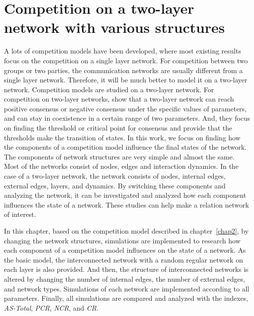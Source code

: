 

\chapter{Competition on a two-layer network with various structures}
\label{chap3}
A lots of competition models have been developed, where most existing results focus on the competition on a single layer network. For competition between two groups or two parties, the communication networks are usually different from a single layer network. Therefore, it will be much better to model it on a two-layer network. Competition models are studied on a two-layer network. For competition on two-layer networks, \parencite{alvarez2016, diep2017, amato2017, gomez2015} show that a two-layer network can reach positive consensus or negative consensus under the specific values of parameters, and can stay in coexistence in a certain range of two parameters. And, they focus on finding the threshold or critical point for consensus and provide that the thresholds make the transition of states. In this work, we focus on finding how the components of a competition model influence the final states of the network. The components of network structures are very simple and almost the same. Most of the networks consist of nodes, edges and interaction dynamics. In the case of a two-layer network, the network consists of nodes, internal edges, external edges, layers, and dynamics. By switching these components and analyzing the network, it can be investigated and analyzed how each component influences the state of a network. These studies can help make a relation network of interest.   

In this chapter, based on the competition model described in chapter~\ref{chap2}, by changing the network structures, simulations are implemented to research how each component of a competition model influences on the state of a network. As the basic model, the interconnected network with a random regular network on each layer is also provided. And then, the structure of interconnected networks is altered by changing the number of internal edges, the number of external edges, and network types. Simulations of each network are implemented according to all parameters. Finally, all simulations are compared and analyzed with the indexes, \textit{AS-Total}, \textit{PCR}, \textit{NCR}, and \textit{CR}.\\

